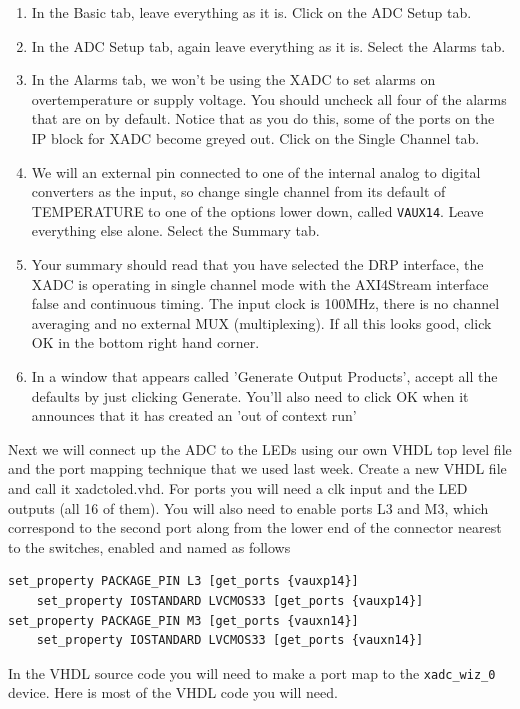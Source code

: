 \documentclass[../physical_computing.tex]{subfiles}
\begin{document}
\begin{enumerate}
    \item In the Basic tab, leave everything as it is. Click on the ADC Setup tab.
    \item In the ADC Setup tab, again leave everything as it is. Select the Alarms tab.
    \item In the Alarms tab, we won't be using the XADC to set alarms on overtemperature or supply voltage. 
    You should uncheck all four of the alarms that are on by default. Notice that as you do this, some of the ports on the IP block for XADC become greyed out. Click on the Single Channel tab. 
    \item We will an external pin connected to one of the internal analog to digital converters as the input, so change single channel from its default of TEMPERATURE to one of the options lower down, called \texttt{VAUX14}. Leave everything else alone. Select the Summary tab.
    \item Your summary should read that you have selected the DRP interface, the XADC is operating in single channel mode with the AXI4Stream interface false and continuous timing. The input clock is 100MHz, there is no channel averaging and no external MUX (multiplexing). If all this looks good, click OK in the bottom right hand corner. 
    \item In a window that appears called 'Generate Output Products', accept all the defaults by just clicking Generate. You'll also need to click OK when it announces that it has created an 'out of context run'
    
\end{enumerate}

Next we will connect up the ADC to the LEDs using our own VHDL top level file and the port mapping technique that we used last week. Create a new VHDL file and call it xadctoled.vhd. For ports you will need a clk input and the LED outputs (all 16 of them). You will also need to enable ports L3 and M3, which correspond to the second port along from the lower end of the connector nearest to the switches, enabled and named as follows

\begin{verbatim}
set_property PACKAGE_PIN L3 [get_ports {vauxp14}]				
	set_property IOSTANDARD LVCMOS33 [get_ports {vauxp14}]
set_property PACKAGE_PIN M3 [get_ports {vauxn14}]				
	set_property IOSTANDARD LVCMOS33 [get_ports {vauxn14}]
\end{verbatim}

In the VHDL source code you will need to make a port map to the \texttt{xadc\_wiz\_0} device. Here is most of the VHDL code you will need.
\end{document}
